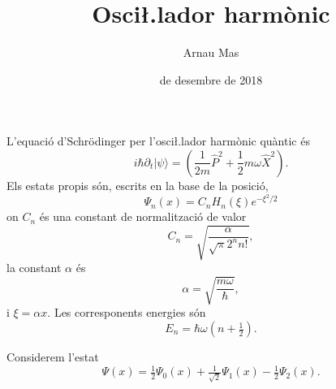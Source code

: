 \documentclass[12pt]{article}
\title{\sffamily {\bfseries Entrega 4:} Osci\l.lador harmònic}
\author{\sffamily Arnau Mas}
\date{\sffamily 10 de desembre de 2018}
\numberwithin{table}{section}
\numberwithin{figure}{section}
\numberwithin{equation}{section}
\newcommand{\ket}[1]{\vert #1 \rangle}
\begin{document}
\maketitle
L'equació d'Schrödinger per l'osci\l.lador harmònic quàntic és
\begin{equation*}
	i\hbar\partial_t\ket{\psi} = \left(\frac{1}{2m} \hat{P}^2 +  \frac{1}{2}m\omega\hat{X}^2\right).
\end{equation*}
Els estats propis són, escrits en la base de la posició,
\begin{equation*}
	\Psi_n(x) = C_n H_n(\xi) e^{-\xi^2/2}
\end{equation*}
on \( C_n \) és una constant de normalització de valor
\begin{equation*}
	C_n = \sqrt{\frac{\alpha}{\sqrt{\pi}2^n n!}},
\end{equation*}
la constant \( \alpha \) és
\begin{equation*}
	\alpha = \sqrt{\frac{m\omega}{\hbar}},
\end{equation*}
i \( \xi = \alpha x \). Les corresponents energies són
\begin{equation*}
	E_n = \hbar \omega\left(n + \tfrac{1}{2}\right).
\end{equation*}

Considerem l'estat
\begin{equation*}
	\Psi(x) = \tfrac{1}{2}\Psi_0(x) + \tfrac{1}{\sqrt{2}}\Psi_1(x) - \tfrac{1}{2}\Psi_2(x).
\end{equation*}
\end{document}
